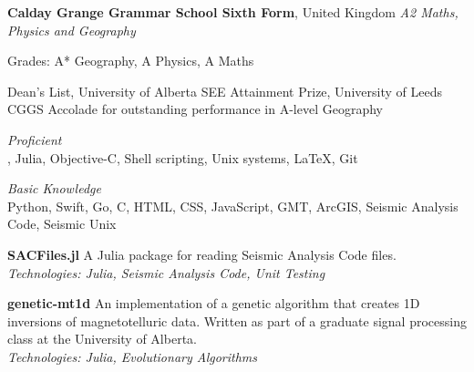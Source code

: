 \documentclass[11pt]{article}
\begin{document}
\medskip
\textbf{Calday Grange Grammar School Sixth Form}, United Kingdom \newline
\emph{A2 Maths, Physics and Geography} 
\begin{itemize*}
\item Grades: A* Geography, A Physics, A Maths
\end{itemize*}

\bigskip

%
Dean's List, University of Alberta  \newline
SEE Attainment Prize, University of Leeds  \newline
CGGS Accolade for outstanding performance in A-level Geography 

\bigskip

%
\emph{Proficient}\\
\ML, Julia, Objective-C, Shell scripting, Unix systems, \LaTeX, Git

\medskip

\emph{Basic Knowledge}\\
Python, Swift, Go, C, HTML, CSS, JavaScript, GMT, ArcGIS, Seismic Analysis Code,
Seismic Unix

\bigskip

%
\textbf{SACFiles.jl}  \newline
A Julia package for reading Seismic Analysis Code files. \\
\emph{Technologies: Julia, Seismic Analysis Code, Unit Testing}

\medskip
\textbf{genetic-mt1d}  \newline
An implementation of a genetic algorithm that creates 1D inversions of
magnetotelluric data. Written as part of a graduate signal processing class at
the University of Alberta. \\
\emph{Technologies: Julia, Evolutionary Algorithms}
\end{document}
